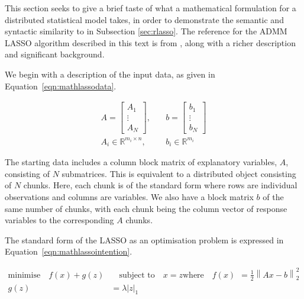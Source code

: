 \documentclass[letterpaper, inpress]{jds} %
\begin{document}
This section seeks to give a brief taste of what a mathematical formulation for a distributed statistical model takes, in order to demonstrate the semantic and syntactic similarity to  in Subsection \ref{sec:rlasso}.
The reference for the ADMM LASSO algorithm described in this text is from \citet{boyd2011}, along with a richer description and significant background.

We begin with a description of the input data, as given in Equation~\ref{eqn:mathlassodata}.

\begin{equation}
\begin{aligned}\label{eqn:mathlassodata}
    A = \begin{bmatrix}
        A_1\\
        \vdots \\
        A_N
    \end{bmatrix},&
    \quad b=\begin{bmatrix}
        b_1\\
        \vdots \\
        b_N
    \end{bmatrix}\\
    A_i \in \mathbb{R}^{m_i\times n},& \quad b_i \in \mathbb{R}^{m_i}
\end{aligned}
\end{equation}

The starting data includes a column block matrix of explanatory variables, $A$, consisting of $N$ submatrices.
This is equivalent to a distributed object consisting of $N$ chunks.
Here, each chunk is of the standard form where rows are individual observations and columns are variables.
We also have a block matrix $b$ of the same number of chunks, with each chunk being the column vector of response variables to the corresponding $A$ chunks.

The standard form of the LASSO as an optimisation problem is expressed in Equation~\ref{eqn:mathlassointention}.

\begin{equation}\label{eqn:mathlassointention}
    \begin{aligned}
        \text{minimise} \quad f(x) + g(z) &\quad \text{subject to} \quad x = z
        \text {where} \quad f(x) &= \frac{1}{2} \left\| Ax - b \right\|^2_2 \\
        g(z) &= \lambda \left| z \right|_1 \\
    \end{aligned} 
\end{equation}
\end{document}
